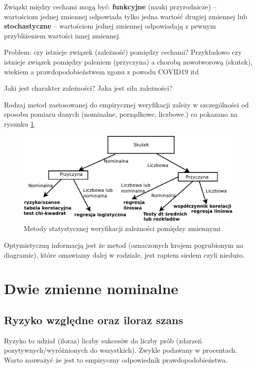 \documentclass[
  openany]{book}
\begin{document}
Związki między cechami mogą być: \textbf{funkcyjne} (nauki przyrodnicze) -- wartościom jednej zmiennej odpowiada tylko jedna wartość drugiej zmiennej lub
\textbf{stochastyczne} -- wartościom jednej zmiennej odpowiadają z pewnym
przybliżeniem wartości innej zmiennej.

Problem: czy istnieje związek (zależność) pomiędzy cechami?
Przykładowo czy istnieje związek pomiędzy paleniem (przyczyna)
a chorobą nowotworową (skutek), wiekiem a prawdopodobieństwem zgonu z powodu COVID19 itd

Jaki jest charakter zależności? Jaka jest siła zależności?

Rodzaj metod zastosowanej do empirycznej weryfikacji zależy
w szczególności od sposobu pomiaru danych (nominalne, porządkowe, liczbowe.)
co pokazano na rysunku \ref{fig:metodyAZ}.

\begin{figure}
\includegraphics[width=0.9\linewidth]{./DiagramMetod} \caption{Metody statystycznej weryfikacji zależności pomiędzy zmiennymi}\label{fig:metodyAZ}
\end{figure}

Optymistyczną informacją jest że metod (oznaczonych krojem pogrubionym na diagramie),
które omawiamy dalej w rodziale, jest raptem siedem czyli niedużo.

\hypertarget{dwie-zmienne-nominalne}{%
\section{Dwie zmienne nominalne}\label{dwie-zmienne-nominalne}}

\hypertarget{ryzyko-wzglux119dne-oraz-iloraz-szans}{%
\subsection{Ryzyko względne oraz iloraz szans}\label{ryzyko-wzglux119dne-oraz-iloraz-szans}}

Ryzyko to udział (iloraz) liczby sukcesów do liczby prób (zdarzeń pozytywnych/wyróżnionych do wszystkich). Zwykle podawany w procentach. Warto zauważyć że jest to
empiryczny odpowiednik prawdopodobieństwa.
\end{document}
